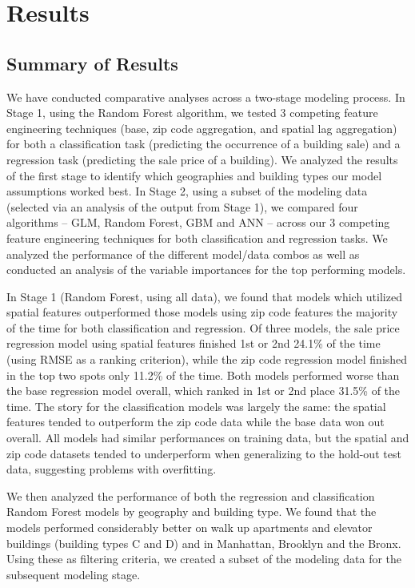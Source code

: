 \documentclass[12pt,]{article}
\begin{document}
\hypertarget{results}{%
\section{Results}\label{results}}

\hypertarget{summary-of-results}{%
\subsection{Summary of Results}\label{summary-of-results}}

We have conducted comparative analyses across a two-stage modeling
process. In Stage 1, using the Random Forest algorithm, we tested 3
competing feature engineering techniques (base, zip code aggregation,
and spatial lag aggregation) for both a classification task (predicting
the occurrence of a building sale) and a regression task (predicting the
sale price of a building). We analyzed the results of the first stage to
identify which geographies and building types our model assumptions
worked best. In Stage 2, using a subset of the modeling data (selected
via an analysis of the output from Stage 1), we compared four algorithms
-- GLM, Random Forest, GBM and ANN -- across our 3 competing feature
engineering techniques for both classification and regression tasks. We
analyzed the performance of the different model/data combos as well as
conducted an analysis of the variable importances for the top performing
models.

In Stage 1 (Random Forest, using all data), we found that models which
utilized spatial features outperformed those models using zip code
features the majority of the time for both classification and
regression. Of three models, the sale price regression model using
spatial features finished 1st or 2nd 24.1\% of the time (using RMSE as a
ranking criterion), while the zip code regression model finished in the
top two spots only 11.2\% of the time. Both models performed worse than
the base regression model overall, which ranked in 1st or 2nd place
31.5\% of the time. The story for the classification models was largely
the same: the spatial features tended to outperform the zip code data
while the base data won out overall. All models had similar performances
on training data, but the spatial and zip code datasets tended to
underperform when generalizing to the hold-out test data, suggesting
problems with overfitting.

We then analyzed the performance of both the regression and
classification Random Forest models by geography and building type. We
found that the models performed considerably better on walk up
apartments and elevator buildings (building types C and D) and in
Manhattan, Brooklyn and the Bronx. Using these as filtering criteria, we
created a subset of the modeling data for the subsequent modeling stage.
\end{document}
